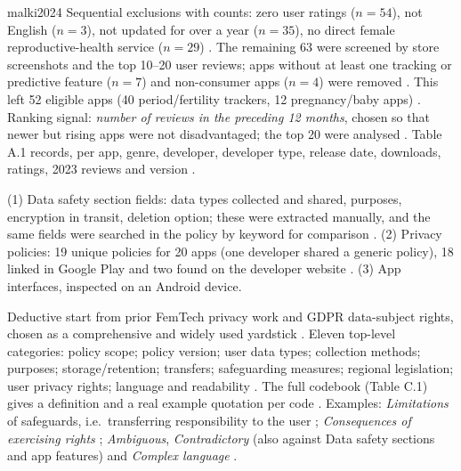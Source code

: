 \begin{papercard}{malki2024}
 Sequential exclusions with counts: zero user ratings ($n=54$), not English ($n=3$), not updated for over a year ($n=35$), no direct female reproductive-health service ($n=29$) . The remaining 63 were screened by store screenshots and the top 10--20 user reviews; apps without at least one tracking or predictive feature ($n=7$) and non-consumer apps ($n=4$) were removed . This left 52 eligible apps (40 period/fertility trackers, 12 pregnancy/baby apps) . Ranking signal: \emph{number of reviews in the preceding 12 months}, chosen so that newer but rising apps were not disadvantaged; the top 20 were analysed . Table A.1 records, per app, genre, developer, developer type, release date, downloads, ratings, 2023 reviews and version .

 (1) Data safety section fields: data types collected and shared, purposes, encryption in transit, deletion option; these were extracted manually, and the same fields were searched in the policy by keyword for comparison . (2) Privacy policies: 19 unique policies for 20 apps (one developer shared a generic policy), 18 linked in Google Play and two found on the developer website . (3) App interfaces, inspected on an Android device.

 Deductive start from prior FemTech privacy work and GDPR data-subject rights, chosen as a comprehensive and widely used yardstick . Eleven top-level categories: policy scope; policy version; user data types; collection methods; purposes; storage/retention; transfers; safeguarding measures; regional legislation; user privacy rights; language and readability . The full codebook (Table C.1) gives a definition and a real example quotation per code . Examples: \emph{Limitations} of safeguards, i.e.\ transferring responsibility to the user ; \emph{Consequences of exercising rights} ; \emph{Ambiguous}, \emph{Contradictory} (also against Data safety sections and app features) and \emph{Complex language} .


\end{papercard}
